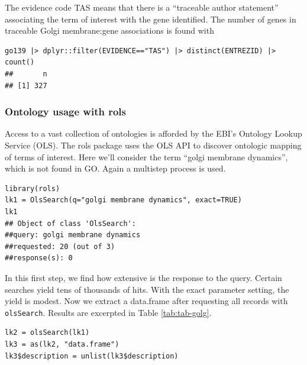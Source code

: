 \documentclass[graybox]{svmult}
\begin{document}
The evidence code TAS means that there is a ``traceable author statement'' associating the term
of interest with the gene identified. The number of genes in traceable Golgi membrane:gene
associations is found with

\begin{shaded}
\begin{verbatim}
go139 |> dplyr::filter(EVIDENCE=="TAS") |> distinct(ENTREZID) |> count()
##       n
## [1] 327
\end{verbatim}
\end{shaded}


\subsubsection{Ontology usage with rols}\label{ontology-usage-with-rols}

Access to a vast collection of ontologies is afforded by the EBI's
Ontology Lookup Service (OLS). The rols package uses the OLS API
to discover ontologic mapping of terms of interest. Here we'll
consider the term ``golgi membrane dynamics'', which is not found in GO.
Again a multistep process is used.

\begin{shaded}
\begin{verbatim}
library(rols)
lk1 = OlsSearch(q="golgi membrane dynamics", exact=TRUE)
lk1
## Object of class 'OlsSearch':
##query: golgi membrane dynamics
##requested: 20 (out of 3)
##response(s): 0
\end{verbatim}
\end{shaded}


In this first step, we find how extensive is the response
to the query. Certain searches yield tens of thousands of hits.
With the exact parameter setting, the yield is modest.
Now we extract a data.frame after requesting all
records with \texttt{olsSearch}.  Results are
excerpted in Table \ref{tab:tab-golg}.

\begin{shaded}
\begin{verbatim}
lk2 = olsSearch(lk1)
lk3 = as(lk2, "data.frame")
lk3$description = unlist(lk3$description)
\end{verbatim}
\end{shaded}
\end{document}
